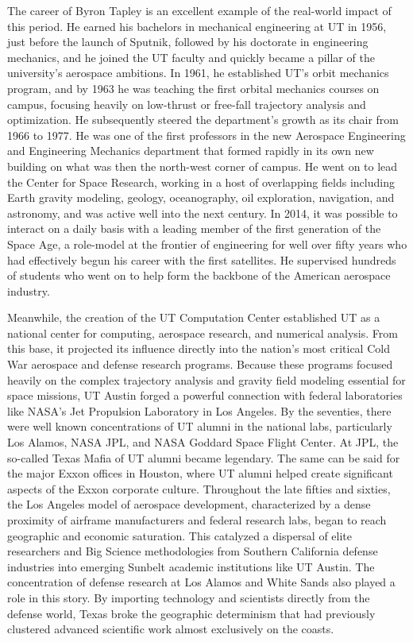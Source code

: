 The career of Byron Tapley is an excellent example of the real-world impact of this period. He earned his bachelors in mechanical engineering at UT in 1956, just before the launch of Sputnik, followed by his doctorate in engineering mechanics, and he joined the UT faculty and quickly became a pillar of the university's aerospace ambitions. In 1961, he established UT's orbit mechanics program, and by 1963 he was teaching the first orbital mechanics courses on campus, focusing heavily on low-thrust or free-fall trajectory analysis and optimization. He subsequently steered the department's growth as its chair from 1966 to 1977. He was one of the first professors in the new Aerospace Engineering and Engineering Mechanics department that formed rapidly in its own new building on what was then the north-west corner of campus. He went on to lead the Center for Space Research, working in a host of overlapping fields including Earth gravity modeling, geology, oceanography, oil exploration, navigation, and astronomy, and was active well into the next century. In 2014, it was possible to interact on a daily basis with a leading member of the first generation of the Space Age, a role-model at the frontier of engineering for well over fifty years who had effectively begun his career with the first satellites. He supervised hundreds of students who went on to help form the backbone of the American aerospace industry.

Meanwhile, the creation of the UT Computation Center established UT as a national center for computing, aerospace research, and numerical analysis. From this base, it projected its influence directly into the nation's most critical Cold War aerospace and defense research programs. Because these programs focused heavily on the complex trajectory analysis and gravity field modeling essential for space missions, UT Austin forged a powerful connection with federal laboratories like NASA's Jet Propulsion Laboratory in Los Angeles. By the seventies, there were well known concentrations of UT alumni in the national labs, particularly Los Alamos, NASA JPL, and NASA Goddard Space Flight Center. At JPL, the so-called Texas Mafia of UT alumni became legendary. The same can be said for the major Exxon offices in Houston, where UT alumni helped create significant aspects of the Exxon corporate culture. Throughout the late fifties and sixties, the Los Angeles model of aerospace development, characterized by a dense proximity of airframe manufacturers and federal research labs, began to reach geographic and economic saturation. This catalyzed a dispersal of elite researchers and Big Science methodologies from Southern California defense industries into emerging Sunbelt academic institutions like UT Austin. The concentration of defense research at Los Alamos and White Sands also played a role in this story. By importing technology and scientists directly from the defense world, Texas broke the geographic determinism that had previously clustered advanced scientific work almost exclusively on the coasts.

